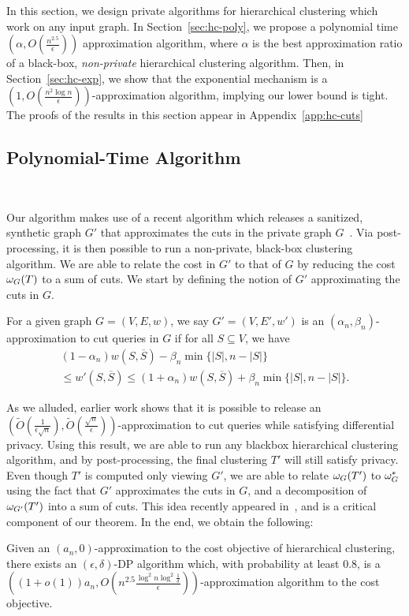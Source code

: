 In this section, we design private algorithms for hierarchical clustering which work on any input graph. In Section~\ref{sec:hc-poly}, we propose a polynomial time $(\alpha, O(\frac{n^{2.5}}{\epsilon}))$ approximation algorithm, where $\alpha$ is the best approximation ratio of a black-box, \emph{non-private} hierarchical clustering algorithm. Then, in Section~\ref{sec:hc-exp}, we show that the exponential mechanism is a $(1, O(\frac{n^{2} \log n}{\epsilon}))$-approximation algorithm, implying our lower bound is tight. The proofs of the results in this section appear in Appendix~\ref{app:hc-cuts}

\subsection{Polynomial-Time Algorithm}~\label{sec:hc-poly}

Our algorithm makes use of a recent algorithm which releases a sanitized, synthetic graph $G'$ that approximates the cuts in the private graph $G$~\citep{eliavs2020differentially,arora2019differentially}. Via post-processing, it is then possible to run a non-private, black-box clustering algorithm. We are able to relate the cost in $G'$ to that of $G$ by reducing the cost $\omega_G(T)$ to a sum of cuts. We start by defining the notion of $G'$ approximating the cuts in $G$.
\begin{defn}\label{def:cut-approx}
    For a given graph $G = (V, E, w)$, we say $G' = (V, E', w')$ is an $(\alpha_n, \beta_n)$-approximation to cut queries in $G$ if for all $S \subseteq V$, we have
    \begin{multline*}
        (1-\alpha_n) w(S, \overline{S}) - \beta_n \min \{|S|, n - |S|\} \\ \leq w'(S, \overline{S}) \leq (1+\alpha_n) w(S, \overline{S}) + \beta_n \min \{|S|, n - |S|\}.
    \end{multline*}
\end{defn}

As we alluded, earlier work shows that it is possible to release an $(\tilde{O}(\frac{1}{\epsilon\sqrt{n}}), \tilde{O}(\frac{\sqrt{n}}{\epsilon}))$-approximation to cut queries while satisfying differential privacy. Using this result, we are able to run any blackbox hierarchical clustering algorithm, and by post-processing, the final clustering $T'$ will still satisfy privacy. Even though $T'$ is computed only viewing $G'$, we are able to relate $\omega_{G}(T')$ to $\omega_G^*$ using the fact that $G'$ approximates the cuts in $G$, and a decomposition of $\omega_{G'}(T')$ into a sum of cuts. This idea recently appeared in~\citet{agarwal2022sublinear}, and is a critical component of our theorem. In the end, we obtain the following:
\begin{thm}
Given an $(a_n, 0)$-approximation to the cost objective of hierarchical clustering, 
there exists an $(\epsilon, \delta)$-DP algorithm which, with probability at least $0.8$, is a  $((1+o(1))a_n, O(n^{2.5} \frac{ \log^2 n \log^2 \frac{1}{\delta}}{\epsilon}))$-approximation algorithm to the cost objective.
\end{thm}

